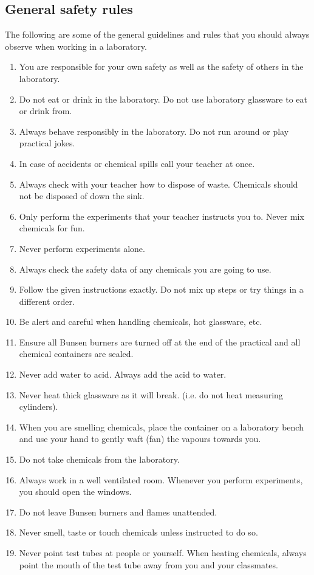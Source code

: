 \subsection*{General safety rules}
            \nopagebreak
The following are some of the general guidelines and rules that you should always observe when working in a laboratory.
\begin{enumerate}[noitemsep, label=\textbf{\arabic*}. ] 
\item You are responsible for your own safety as well as the safety of others in the laboratory.
\item Do not eat or drink in the laboratory. Do not use laboratory glassware to eat or drink from.
\item Always behave responsibly in the laboratory. Do not run around or play practical jokes.
\item In case of accidents or chemical spills call your teacher at once.
\item Always check with your teacher how to dispose of waste. Chemicals should not be disposed of down the sink.
\item Only perform the experiments that your teacher instructs you to. Never mix chemicals for fun.
\item Never perform experiments alone. 
\item Always check the safety data of any chemicals you are going to use. 
\item Follow the given instructions exactly. Do not mix up steps or try things in a different order.
\item Be alert and careful when handling chemicals, hot glassware, etc.  
\item Ensure all Bunsen burners are turned off at the end of the practical and all chemical containers are sealed.
\item Never add water to acid. Always add the acid to water.
\item Never heat thick glassware as it will break. (i.e.\@{} do not heat measuring cylinders).
\item When you are smelling chemicals, place the container on a laboratory bench and use your hand to gently waft (fan) the vapours towards you.
\item Do not take chemicals from the laboratory.
\item Always work in a well ventilated room. Whenever you perform experiments, you should open the windows.
\item Do not leave Bunsen burners and flames unattended. 
\item Never smell, taste or touch chemicals unless instructed to do so.
\item Never point test tubes at people or yourself. When heating chemicals, always point the mouth of the test tube away from you and your classmates.
\end{enumerate}
\par 
